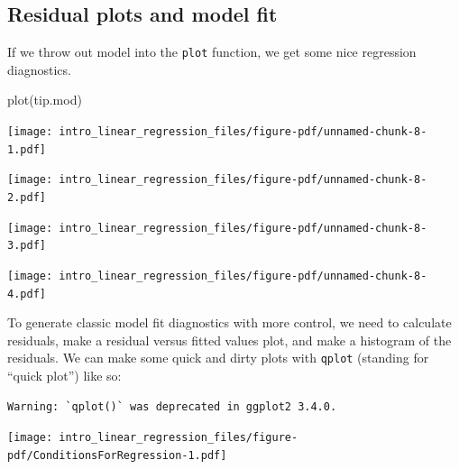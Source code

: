 \documentclass[
  letterpaper,
  DIV=11,
  numbers=noendperiod]{scrreprt}
\newenvironment{Shaded}{}{}
\newcommand{\FunctionTok}[1]{\textcolor[rgb]{0.02,0.16,0.49}{#1}}
\newcommand{\NormalTok}[1]{#1}
\newcommand{\SpecialCharTok}[1]{\textcolor[rgb]{0.25,0.44,0.63}{#1}}
\begin{document}
\subsection{Residual plots and model
fit}\label{residual-plots-and-model-fit}

If we throw out model into the \texttt{plot} function, we get some nice
regression diagnostics.

\begin{Shaded}
\begin{Highlighting}[]
\FunctionTok{plot}\NormalTok{(tip.mod)}
\end{Highlighting}
\end{Shaded}

\begin{center}
\texttt{[image: intro\_linear\_regression\_files/figure-pdf/unnamed-chunk-8-1.pdf]}
\end{center}

\begin{center}
\texttt{[image: intro\_linear\_regression\_files/figure-pdf/unnamed-chunk-8-2.pdf]}
\end{center}

\begin{center}
\texttt{[image: intro\_linear\_regression\_files/figure-pdf/unnamed-chunk-8-3.pdf]}
\end{center}

\begin{center}
\texttt{[image: intro\_linear\_regression\_files/figure-pdf/unnamed-chunk-8-4.pdf]}
\end{center}

To generate classic model fit diagnostics with more control, we need to
calculate residuals, make a residual versus fitted values plot, and make
a histogram of the residuals. We can make some quick and dirty plots
with \texttt{qplot} (standing for ``quick plot'') like so:

\begin{Shaded}
\end{Shaded}

\begin{verbatim}
Warning: `qplot()` was deprecated in ggplot2 3.4.0.
\end{verbatim}

\begin{center}
\texttt{[image: intro\_linear\_regression\_files/figure-pdf/ConditionsForRegression-1.pdf]}
\end{center}
\end{document}
